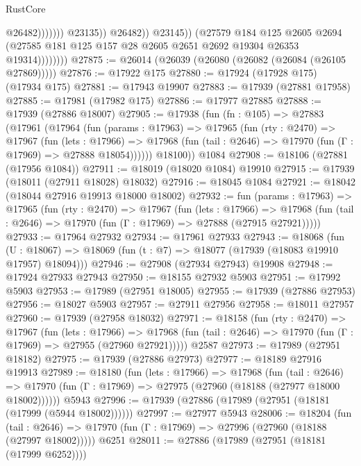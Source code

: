\begin{lexlean}{RustCore}
\begin{coremodule}
                                          @26482)))))))
                            @23135))
                        @26482))
                    @23145))
                (@27579
                  @184
                  @125
                  @2605
                  @2694
                  (@27585 @181 @125 @157 @28 @2605 @2651 @2692 @19304 @26353 @19314))))))))
@27875 := @26014 (@26039 (@26080 (@26082 (@26084 (@26105 @27869)))))
@27876 := @17922 @175
@27880 := @17924 (@17928 @175) (@17934 @175)
@27881 := @17943 @19907
@27883 := @17939 (@27881 @17958)
@27885 := @17981 (@17982 @175)
@27886 := @17977 @27885
@27888 := @17939 (@27886 @18007)
@27905 := @17938
    (fun (fn : @105) =>
    @27883
      (@17961
        (@17964
          (fun (params : @17963) =>
          @17965
            (fun (rty : @2470) =>
            @17967
              (fun (lets : @17966) =>
              @17968 (fun (tail : @2646) => @17970 (fun (Γ : @17969) => @27888 @18054))))))
        @18100))
    @1084
@27908 := @18106 (@27881 (@17956 @1084))
@27911 := @18019 (@18020 @1084) @19910
@27915 := @17939 (@18011 (@27911 @18028) @18032)
@27916 := @18045 @1084
@27921 := @18042 (@18044 @27916 @19913 @18000 @18002)
@27932 := fun (params : @17963) =>
  @17965
    (fun (rty : @2470) =>
    @17967
      (fun (lets : @17966) =>
      @17968 (fun (tail : @2646) => @17970 (fun (Γ : @17969) => @27888 (@27915 @27921)))))
@27933 := @17964 @27932
@27934 := @17961 @27933
@27943 := @18068
    (fun (U : @18067) => @18069 (fun (t : @7) => @18077 (@17939 (@18083 @19910 @17957) @18094)))
@27946 := @27908 (@27934 @27943) @19908
@27948 := @17924 @27933 @27943
@27950 := @18155 @27932 @5903
@27951 := @17992 @5903
@27953 := @17989 (@27951 @18005)
@27955 := @17939 (@27886 @27953)
@27956 := @18027 @5903
@27957 := @27911 @27956
@27958 := @18011 @27957
@27960 := @17939 (@27958 @18032)
@27971 := @18158
    (fun (rty : @2470) =>
    @17967
      (fun (lets : @17966) =>
      @17968 (fun (tail : @2646) => @17970 (fun (Γ : @17969) => @27955 (@27960 @27921)))))
    @2587
@27973 := @17989 (@27951 @18182)
@27975 := @17939 (@27886 @27973)
@27977 := @18189 @27916 @19913
@27989 := @18180
    (fun (lets : @17966) =>
    @17968
      (fun (tail : @2646) =>
      @17970 (fun (Γ : @17969) => @27975 (@27960 (@18188 (@27977 @18000 @18002))))))
    @5943
@27996 := @17939 (@27886 (@17989 (@27951 (@18181 (@17999 (@5944 @18002))))))
@27997 := @27977 @5943
@28006 := @18204
    (fun (tail : @2646) => @17970 (fun (Γ : @17969) => @27996 (@27960 (@18188 (@27997 @18002)))))
    @6251
@28011 := @27886 (@17989 (@27951 (@18181 (@17999 @6252))))

\end{coremodule}
\end{lexlean}
